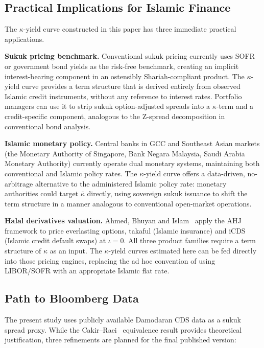\documentclass[12pt]{article}
\theoremstyle{plain}
\theoremstyle{definition}
\theoremstyle{remark}
\begin{document}
\subsection{Practical Implications for Islamic Finance}

The $\kappa$-yield curve constructed in this paper has three immediate
practical applications.

\textbf{Sukuk pricing benchmark.} Conventional sukuk pricing currently uses
SOFR or government bond yields as the risk-free benchmark, creating an
implicit interest-bearing component in an ostensibly Shariah-compliant
product. The $\kappa$-yield curve provides a term structure that is derived
entirely from observed Islamic credit instruments, without any reference to
interest rates. Portfolio managers can use it to strip sukuk option-adjusted
spreads into a $\kappa$-term and a credit-specific component, analogous to
the Z-spread decomposition in conventional bond analysis.

\textbf{Islamic monetary policy.} Central banks in GCC and Southeast Asian
markets (the Monetary Authority of Singapore, Bank Negara Malaysia, Saudi
Arabia Monetary Authority) currently operate dual monetary systems,
maintaining both conventional and Islamic policy rates. The $\kappa$-yield
curve offers a data-driven, no-arbitrage alternative to the administered Islamic
policy rate: monetary authorities could target $\bar{\kappa}$ directly, using
sovereign sukuk issuance to shift the term structure in a manner analogous to
conventional open-market operations.

\textbf{Halal derivatives valuation.} Ahmed, Bhuyan and
Islam~\cite{AhmedBhuyanIslam2026} apply the AHJ framework to price everlasting
options, takaful (Islamic insurance) and iCDS (Islamic credit default swaps)
at $\iota = 0$. All three product families require a term structure of
$\kappa$ as an input. The $\kappa$-yield curves estimated here can be fed
directly into those pricing engines, replacing the ad hoc convention of using
LIBOR/SOFR with an appropriate Islamic flat rate.

\subsection{Path to Bloomberg Data}

The present study uses publicly available Damodaran CDS data as a sukuk spread
proxy. While the Cakir--Raei~\cite{CakırRaei2007} equivalence result provides
theoretical justification, three refinements are planned for the final
published version:
\end{document}
